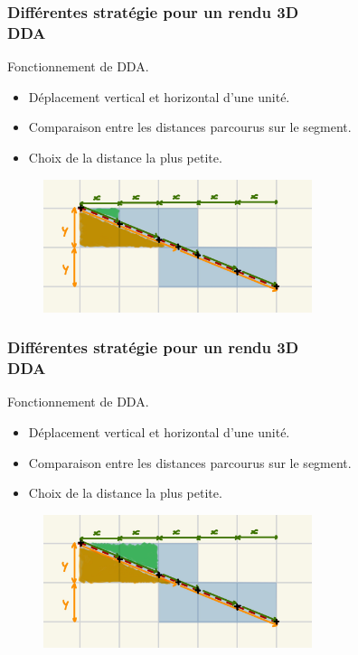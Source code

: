 \documentclass{beamer}
\begin{document}
\begin{frame}
    \frametitle{Différentes stratégie pour un rendu 3D \\
                \small DDA}           
    \begin{block}{Fonctionnement de DDA.}
        \begin{itemize}
            \item Déplacement vertical et horizontal d'une unité.
            \item Comparaison entre les distances parcourus sur le segment.
            \item Choix de la distance la plus petite.
        \end{itemize}
    \end{block}    
    \begin{figure}
        \centering
        \includegraphics[width=0.7\textwidth]{images/DDA 1.jpg}
    \end{figure}
\end{frame}

\begin{frame}
    \frametitle{Différentes stratégie pour un rendu 3D \\
                \small DDA}           
    \begin{block}{Fonctionnement de DDA.}
        \begin{itemize}
            \item Déplacement vertical et horizontal d'une unité.
            \item Comparaison entre les distances parcourus sur le segment.
            \item Choix de la distance la plus petite.
        \end{itemize}
    \end{block}    
    \begin{figure}
        \centering
        \includegraphics[width=0.7\textwidth]{images/DDA 2.jpg}
    \end{figure}
\end{frame}
\end{document}
